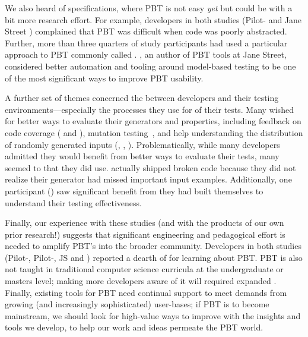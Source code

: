We also heard  of specifications, where PBT is not easy {\em yet} but
could be with a bit more research effort. For example, developers in
both studies (Pilot- and Jane Street ) complained
that PBT was difficult when code was poorly abstracted.  Further,
more than three
quarters of study participants had used a particular approach to PBT commonly
called .  , an author of PBT tools
at Jane Street, considered better automation and tooling around model-based
testing to be one of the most significant ways to improve PBT usability.


A further set of themes concerned the
 between developers and their
testing environments---especially the processes they use
for  of their tests. Many
wished for
better ways to evaluate their generators and properties, including
feedback on code coverage ( and ),
mutation
testing~\cite{papadakis_mutation_2018}, and help understanding the
distribution of randomly generated
inputs (, , ). Problematically,
while many developers admitted they would benefit from better ways to
evaluate their tests, many seemed to
 that they did use.  actually shipped broken code because
they did not realize their generator had missed important input
examples.
Additionally, one participant () saw significant benefit from
 they had built themselves to
understand their testing effectiveness.

Finally, our experience with these studies (and with the products of
our own prior research!) suggests
that significant engineering and pedagogical effort is needed to amplify
PBT's  into the broader community.  Developers in both studies
(Pilot-, Pilot-, JS  and
) reported a dearth of  for
learning about PBT.  PBT is also not
taught in traditional computer science curricula at the undergraduate
or masters level; making more developers
aware of it will required expanded
.
%
Finally, existing tools for PBT need continual
support to meet demands from growing (and increasingly sophisticated)
user-bases; if PBT is to become mainstream, we should look for high-value
ways to improve
 with the insights and tools we develop, to help our
work and ideas permeate the PBT world.


